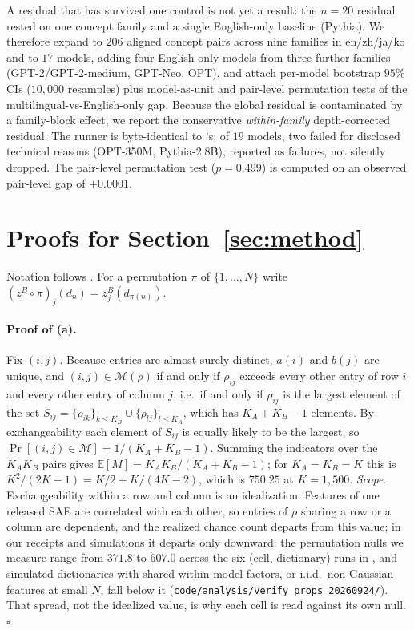 A residual that has survived one control is not yet a result: the $n{=}20$ residual rested
on one concept family and a single English-only baseline (Pythia). We therefore expand
to $206$ aligned concept pairs across nine families
in en/zh/ja/ko and to $17$ models, adding four English-only models from three further families (GPT-2/GPT-2-medium, GPT-Neo, OPT), and attach per-model bootstrap $95\%$ CIs ($10{,}000$ resamples) plus
model-as-unit and pair-level permutation tests of the multilingual-vs-English-only gap.
Because the global residual is
contaminated by a family-block effect, we report the conservative \emph{within-family}
depth-corrected residual. The runner is byte-identical to
's; of $19$ models, two failed for disclosed
technical reasons (OPT-350M, Pythia-2.8B), reported as failures, not silently dropped. The pair-level permutation test ($p=0.499$) is computed on an observed pair-level gap of $+0.0001$.


\section{Proofs for Section~\ref{sec:method}}\label{app:proofs}

Notation follows . For a permutation $\pi$ of $\{1,\dots,N\}$ write
$(z^B\!\circ\pi)_j(d_n)=z^B_j(d_{\pi(n)})$.

\paragraph{Proof of (a).} Fix $(i,j)$. Because entries are almost surely
distinct, $a(i)$ and $b(j)$ are unique, and $(i,j)\in\mathcal{M}(\rho)$ if and only if
$\rho_{ij}$ exceeds every other entry of row $i$ and every other entry of column $j$, i.e.\ if
and only if $\rho_{ij}$ is the largest element of the set
$S_{ij}=\{\rho_{ik}\}_{k\le K_B}\cup\{\rho_{lj}\}_{l\le K_A}$, which has $K_A+K_B-1$ elements.
By exchangeability each element of $S_{ij}$ is equally likely to be the largest, so
$\Pr[(i,j)\in\mathcal{M}]=1/(K_A+K_B-1)$. Summing the indicators over the $K_AK_B$ pairs gives
$\mathbb{E}[M]=K_AK_B/(K_A+K_B-1)$; for $K_A=K_B=K$ this is $K^2/(2K-1)=K/2+K/(4K-2)$, which is
$750.25$ at $K=1{,}500$. \emph{Scope.} Exchangeability within a row and column is an
idealization. Features of one released SAE are correlated with each other, so entries of $\rho$
sharing a row or a column are dependent, and the realized chance count departs from this
value; in our receipts and simulations it departs only downward: the permutation nulls we
measure range from $371.8$ to $607.0$ across the six (cell, dictionary) runs in
, and simulated dictionaries with shared within-model factors, or i.i.d.\
non-Gaussian features at small $N$, fall below it
(\texttt{code/analysis/verify\_props\_20260924/}). That spread, not the idealized value, is
why each cell is read against its own null. \hfill$\square$

